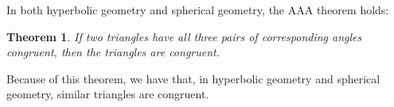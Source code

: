 \documentclass[12pt]{article}
\newtheorem{thm*}{Theorem}
\begin{document}
In both hyperbolic geometry and spherical geometry, the AAA theorem holds:

\begin{thm*}
If two triangles have all three pairs of corresponding angles congruent, then the triangles are congruent.
\end{thm*}

Because of this theorem, we have that, in hyperbolic geometry and spherical geometry, similar triangles are congruent.
\end{document}
